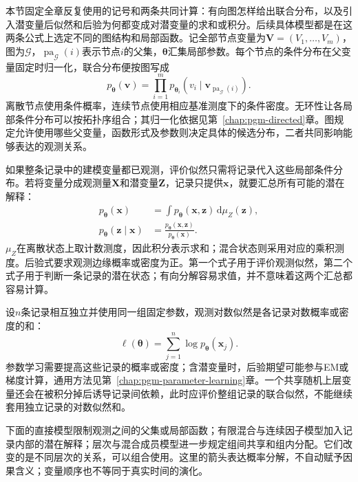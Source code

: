 本节固定全章反复使用的记号和两条共同计算：有向图怎样给出联合分布，以及引入潜变量后似然和后验为何都变成对潜变量的求和或积分。后续具体模型都是在这两条公式上选定不同的图结构和局部函数。记全部节点变量为$\bm V=(V_1,\ldots,V_m)$，图为$\mathcal G$，$\operatorname{pa}_{\mathcal G}(i)$表示节点$i$的父集，$\bm\theta$汇集局部参数。每个节点的条件分布在父变量固定时归一化，联合分布便按图写成
\begin{equation}
  p_{\bm\theta}(\bm v)
    =\prod_{i=1}^m
       p_{\bm\theta_i}(v_i\mid
          \bm v_{\operatorname{pa}_{\mathcal G}(i)}).
  \label{eq:pgm-static-directed-common-joint}
\end{equation}
离散节点使用条件概率，连续节点使用相应基准测度下的条件密度。无环性让各局部条件分布可以按拓扑序组合；其归一化依据见第~\ref{chap:pgm-directed}章。图规定允许使用哪些父变量，函数形式及参数则决定具体的候选分布，二者共同影响能够表达的观测关系。

如果整条记录中的建模变量都已观测，评价似然只需将记录代入这些局部条件分布。若将变量分成观测量$\bm X$和潜变量$\bm Z$，记录只提供$\bm x$，就要汇总所有可能的潜在解释：
\begin{equation}
  \begin{aligned}
    p_{\bm\theta}(\bm x)
      &=\int p_{\bm\theta}(\bm x,\bm z)
                    \,\mathrm d\mu_Z(\bm z),\\
    p_{\bm\theta}(\bm z\mid\bm x)
      &=\frac{p_{\bm\theta}(\bm x,\bm z)}
                    {p_{\bm\theta}(\bm x)}.
  \end{aligned}
  \label{eq:pgm-static-directed-common-marginal}
\end{equation}
$\mu_Z$在离散状态上取计数测度，因此积分表示求和；混合状态则采用对应的乘积测度。后验式要求观测边缘概率或密度为正。第一个式子用于评价观测似然，第二个式子用于判断一条记录的潜在状态；有向分解容易求值，并不意味着这两个汇总都容易计算。

设$n$条记录相互独立并使用同一组固定参数，观测对数似然是各记录对数概率或密度的和：
\[
  \ell(\bm\theta)=\sum_{j=1}^n\log p_{\bm\theta}(\bm x_j).
\]
参数学习需要提高这些记录的概率或密度；含潜变量时，后验期望可能参与EM或梯度计算，通用方法见第~\ref{chap:pgm-parameter-learning}章。一个共享随机上层变量还会在被积分掉后诱导记录间依赖，此时应评价整组记录的联合似然，不能继续套用独立记录的对数似然和。

下面的直接模型限制观测之间的父集或局部函数；有限混合与连续因子模型加入记录内部的潜在解释；层次与混合成员模型进一步规定组间共享和组内分配。它们改变的是不同层次的关系，可以组合使用。这里的箭头表达概率分解，不自动赋予因果含义；变量顺序也不等同于真实时间的演化。

